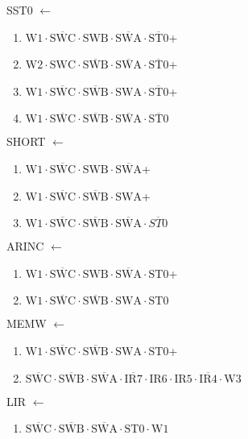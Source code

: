 \documentclass[UTF8]{ctexart}
\begin{document}
SST0 $\leftarrow$
\begin{enumerate}[\indent\indent]
	\item $\text{W1} \cdot \overline{\text{SWC}} \cdot \text{SWB} \cdot \overline{\text{SWA}} \cdot \overline{\text{ST0}}$+
	\item $\text{W2} \cdot \text{SWC} \cdot \overline{\text{SWB}} \cdot \overline{\text{SWA}} \cdot \overline{\text{ST0}}$+
	\item $\text{W1} \cdot \overline{\text{SWC}} \cdot \overline{\text{SWB}} \cdot \text{SWA} \cdot \overline{\text{ST0}}$+
	\item $\text{W1} \cdot \overline{\text{SWC}} \cdot \overline{\text{SWB}} \cdot \overline{\text{SWA}} \cdot \overline{\text{ST0}}$
\end{enumerate}
SHORT $\leftarrow$
\begin{enumerate}[\indent\indent]
	\item $\text{W1} \cdot \overline{\text{SWC}} \cdot \text{SWB} \cdot \overline{\text{SWA}}$+
	\item $\text{W1} \cdot \overline{\text{SWC}} \cdot \overline{\text{SWB}} \cdot \text{SWA}$+
	\item $\text{W1} \cdot \overline{\text{SWC}} \cdot \overline{\text{SWB}} \cdot \overline{\text{SWA}} \cdot \overline{ST0}$
\end{enumerate}
ARINC $\leftarrow$
\begin{enumerate}[\indent\indent]
	\item $\text{W1} \cdot \overline{\text{SWC}} \cdot \text{SWB} \cdot \overline{\text{SWA}} \cdot \text{ST0}$+
	\item $\text{W1} \cdot \overline{\text{SWC}} \cdot \overline{\text{SWB}} \cdot \text{SWA} \cdot \text{ST0}$
\end{enumerate}
MEMW $\leftarrow$
\begin{enumerate}[\indent\indent]
	\item $\text{W1} \cdot \overline{\text{SWC}} \cdot \overline{\text{SWB}} \cdot \text{SWA} \cdot \text{ST0}$+
	\item $\overline{\text{SWC}} \cdot\overline{\text{SWB}}\cdot \overline{\text{SWA}} \cdot \overline{\text{IR7}} \cdot \text{IR6} \cdot \text{IR5} \cdot \overline{\text{IR4}} \cdot \text{W3}$
\end{enumerate}
LIR $\leftarrow$
\begin{enumerate}[\indent\indent]
	\item $\overline{\text{SWC}} \cdot\overline{\text{SWB}}\cdot \overline{\text{SWA}} \cdot \text{ST0} \cdot \text{W1}$
\end{enumerate}
\end{document}
